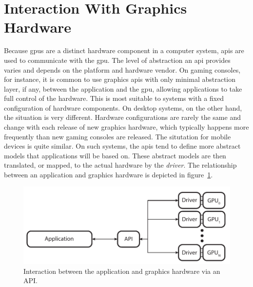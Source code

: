   \section{Interaction With Graphics Hardware}
  \label{sec:HardwareInteraction}
    Because \glspl{gpu} are a distinct hardware component in a computer system, \glspl{api} are used to communicate with the \gls{gpu}.
    The level of abstraction an \gls{api} provides varies and depends on the platform and hardware vendor.
    On gaming consoles, for instance, it is common to use graphics \glspl{api} with only minimal abstraction layer, if any, between the application and the \gls{gpu}, allowing applications to take full control of the hardware.
    This is most suitable to systems with a fixed configuration of hardware components.
    On desktop systems, on the other hand, the situation is very different.
    Hardware configurations are rarely the same and change with each release of new graphics hardware, which typically happens more frequently than new gaming consoles are released.
    The situtation for mobile devices is quite similar.
    On such systems, the \glspl{api} tend to define more abstract models that applications will be based on.
    These abstract models are then translated, or mapped, to the actual hardware by the \textit{driver}.
    The relationship between an application and graphics hardware is depicted in figure~\ref{fig:AppApiDriverOverview}.

    \begin{figure}
      \centering
      \includegraphics[width=\textwidth]{Main/Images/Application_API_Driver_Overview}
      \caption{Interaction between the application and graphics hardware via an API.}
      \label{fig:AppApiDriverOverview}
    \end{figure}


